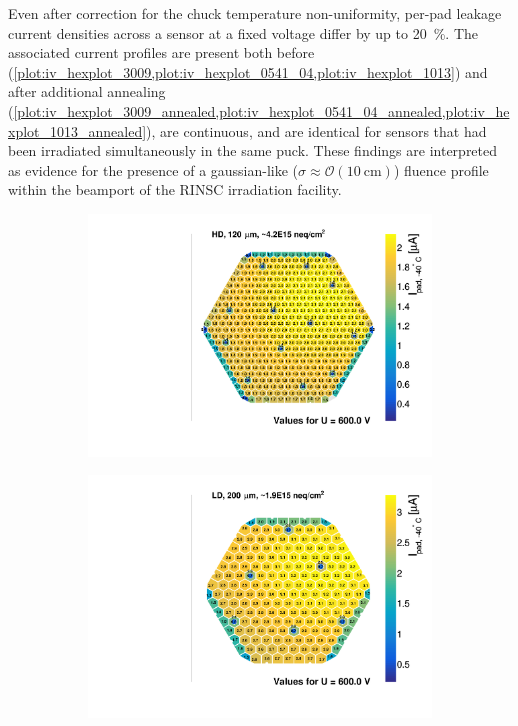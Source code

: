Even after correction for the chuck temperature non-uniformity, per-pad leakage current densities across a sensor at a fixed voltage differ by up to \SI{20}{\percent}.
The associated current profiles are present both before (\ref{plot:iv_hexplot_3009,plot:iv_hexplot_0541_04,plot:iv_hexplot_1013}) and after additional annealing (\ref{plot:iv_hexplot_3009_annealed,plot:iv_hexplot_0541_04_annealed,plot:iv_hexplot_1013_annealed}), are continuous, and are identical for sensors that had been irradiated simultaneously in the same puck.
These findings are interpreted as evidence for the presence of a gaussian-like ($\sigma\approx\mathcal{O}(\SI{10}{\centi\metre})$) fluence profile within the beamport of the RINSC irradiation facility.
\begin{figure}
	\captionsetup[subfigure]{aboveskip=-1pt,belowskip=-1pt}
	\centering
	\begin{subfigure}[b]{0.32\textwidth}
		\includegraphics[width=0.999\textwidth]{plots/iv_hexplots/3009.pdf}
		\subcaption{
		}
		\label{plot:iv_hexplot_3009}
	\end{subfigure}
	\hfill
	\begin{subfigure}[b]{0.32\textwidth}
		\includegraphics[width=0.999\textwidth]{plots/iv_hexplots/0541_04.pdf}

\end{subfigure}
\end{figure}
